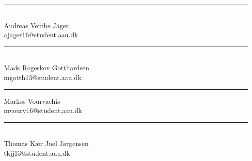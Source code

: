 
\vspace{1.5\baselineskip}
\begin{minipage}[b]{0.45\textwidth}
 \centering
 \rule{\textwidth}{0.45pt}\\
  Andreas Vembe Jäger\\
 {\footnotesize ajager16@student.aau.dk}
\end{minipage}
\vspace{1.5\baselineskip}
\hfill
\begin{minipage}[b]{0.45\textwidth}
 \centering
 \rule{\textwidth}{0.45pt}\\
  Mads Røgeskov Gotthardsen\\
 {\footnotesize mgotth13@student.aau.dk}
\end{minipage}

\begin{minipage}[b]{0.45\textwidth}
 \centering
 \rule{\textwidth}{0.5pt}
   Markos Vourvachis\\
 {\footnotesize mvourv16@student.aau.dk}
\end{minipage}
\vspace{1.5\baselineskip}
\hfill
\begin{minipage}[b]{0.45\textwidth}
 \centering
 \rule{\textwidth}{0.45pt}\\
   Thomas Kær Juel Jørgensen\\
 {\footnotesize tkjj13@student.aau.dk}
\end{minipage}

